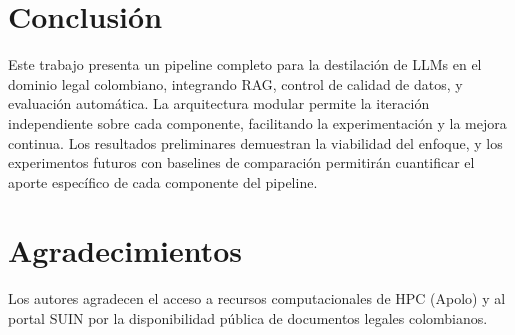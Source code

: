 \documentclass[conference]{IEEEtran}
\begin{document}
\section{Conclusi\'on}
\label{sec:conclusion}

Este trabajo presenta un pipeline completo para la destilaci\'on de LLMs en el dominio legal colombiano, integrando RAG, control de calidad de datos, y evaluaci\'on autom\'atica. La arquitectura modular permite la iteraci\'on independiente sobre cada componente, facilitando la experimentaci\'on y la mejora continua. Los resultados preliminares demuestran la viabilidad del enfoque, y los experimentos futuros con baselines de comparaci\'on permitir\'an cuantificar el aporte espec\'ifico de cada componente del pipeline.

\section*{Agradecimientos}

Los autores agradecen el acceso a recursos computacionales de HPC (Apolo) y al portal SUIN por la disponibilidad p\'ublica de documentos legales colombianos.


\end{document}

